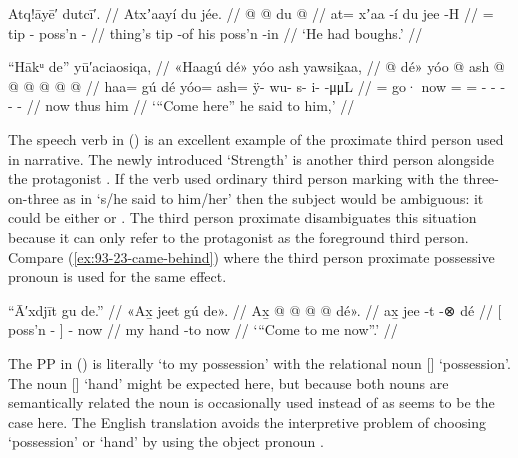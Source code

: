 \ex\label{ex:93-26-boughs}%
%
\begingl
	\glpreamble	Atq!āyē′ dutcī′. //
	\glpreamble	Atxʼaayí du jée. //
	\gla	{}  @ {} @ {} {} 
		{} du  @ {} {} //
	\glb	{} at= xʼaa -í {}
		{} du jee -H {} //
	\glc	{} = tip - {}
		{}  poss’n - {} //
	\gld	{} thing’s\• tip -of {}
		{} his poss’n -in {} //
	\glft	‘He had boughs.’
		//
\endgl
\xe

\ex\label{ex:93-27-cmere}%
%
\begingl
	\glpreamble	“Hākᵘ de” yū′aciaosiqa, //
	\glpreamble	«\!Haagú dé\!» yóo ash yawsiḵaa, //
	\gla	{} @ {} dé\!» yóo @ ash @  @ {} @ {} @ {} @ {} @ {} //
	\glb	\pqp{}haa= gú dé
		yóo= ash= ÿ- wu- s- i-  -μμL //
	\glc	\pqp{}= go· now
		= = - - - -  - //
	\gld	\pqp{} {} now
		thus him  {} {} {} {} {} //
	\glft	‘“Come here” he said to him,’
		//
\endgl
\xe

The speech verb in (\lastx) is an excellent example of the proximate third person used in narrative.
The newly introduced  ‘Strength’ is another third person alongside the protagonist .
If the verb used ordinary third person marking with the three-on-three  as in  ‘s/he said to him/her’ then the subject would be ambiguous: it could be either  or .
The third person proximate  disambiguates this situation because it can only refer to the protagonist as the foreground third person.
Compare (\ref{ex:93-23-came-behind}) where the third person proximate possessive pronoun is used for the same effect.

\ex\label{ex:93-28-come-to-me-now}%
%
\begingl
	\glpreamble	“Ā′xdjīt gu de.” //
	\glpreamble	«\!Ax̱ jeet gú de\!». //
	\gla	{} Ax̱  @ {} {}
		 @ {} @ {} @ {}
		dé\!». //
	\glb	{} ax̱ jee -t {}
		{} {}  -⊗
		dé //
	\glc	{}[  poss’n - {}]
		\· \·  -
		now //
	\gld	{} my hand -to {}
		 {} {} {}
		now //
	\glft	‘“Come to me now”.’
		//
\endgl
\xe

The PP  in (\lastx) is literally ‘to my possession’ with the relational noun  [] ‘possession’.
The noun  [] ‘hand’ might be expected here, but because both nouns are semantically related the noun  is occasionally used instead of  as seems to be the case here.
The English translation avoids the interpretive problem of choosing ‘possession’ or ‘hand’ by using the object pronoun .

